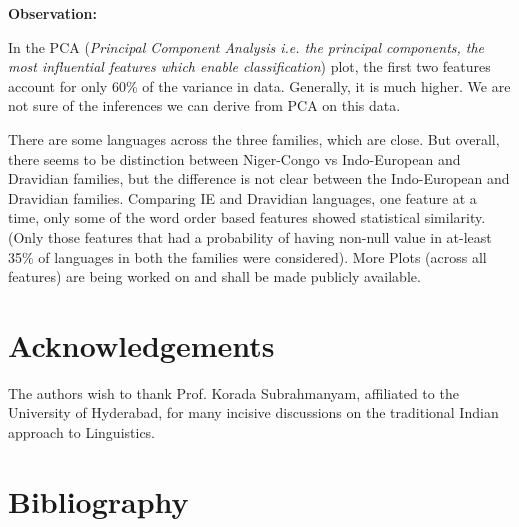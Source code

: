 \textbf{Observation:}

In the PCA (\textit{Principal Component Analysis i.e. the principal components, the most influential features which enable classification}) plot, the first two features account for only 60\% of the variance in data. Generally, it is much higher. We are not sure of the inferences we can derive from PCA on this data.

There are some languages across the three families, which are close. But overall, there seems to be distinction between Niger-Congo vs Indo-European and Dravidian families, but the difference is not clear between the Indo-European and Dravidian families. Comparing IE and Dravidian languages, one feature at a time, only some of the word order based features showed statistical similarity. (Only those features that had a probability of having non-null value in at-least 35\% of languages in both the families were considered). More Plots (across all features) are being worked on and shall be made publicly available.


\section*{Acknowledgements}

The authors wish to thank Prof. Korada Subrahmanyam, affiliated to the University of Hyderabad, for many incisive discussions on the traditional Indian approach to Linguistics.


\section*{Bibliography}


